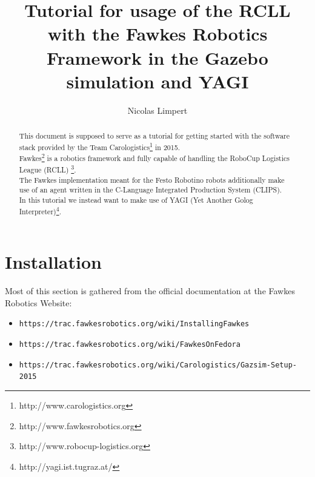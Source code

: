 \documentclass[oribibl]{llncs}
\begin{document}
 \title{Tutorial for usage of the RCLL with the Fawkes Robotics Framework in the Gazebo simulation and YAGI}

\author{Nicolas Limpert} 

\maketitle

\begin{abstract}
        This document is supposed to serve as a tutorial for getting started with the software stack provided by the Team Carologistics\footnote{http://www.carologistics.org} in 2015.\\
        Fawkes\footnote{http://www.fawkesrobotics.org} is a robotics framework and fully capable of handling the RoboCup Logistics League (RCLL) \footnote{http://www.robocup-logistics.org}.\\
        The Fawkes implementation meant for the Festo Robotino robots additionally make use of an agent written in the C-Language Integrated Production System (CLIPS).\\
        In this tutorial we instead want to make use of YAGI (Yet Another Golog Interpreter)\footnote{http://yagi.ist.tugraz.at/}.
\end{abstract}

\section{Installation}
Most of this section is gathered from the official documentation at the Fawkes Robotics Website:
\begin{itemize}
        \item \texttt{https://trac.fawkesrobotics.org/wiki/InstallingFawkes}
        \item \texttt{https://trac.fawkesrobotics.org/wiki/FawkesOnFedora}
        \item \texttt{https://trac.fawkesrobotics.org/wiki/Carologistics/Gazsim-Setup-2015}
\end{itemize}
\end{document}

